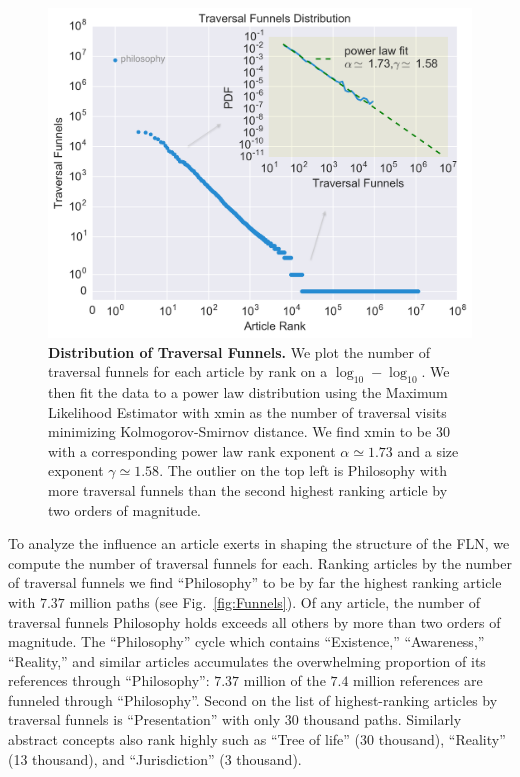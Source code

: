 \documentclass[pre,twocolumn,twoside,superscriptaddress,floatfix]{revtex4-1}
\begin{document}
{\begin{figure}[tp!]
  \includegraphics[width=\columnwidth]{fig012_funnels_distribution.pdf}
  \caption{
    \textbf{Distribution of Traversal Funnels.}
    We plot the number of traversal funnels for each article by rank on a $\log_{10}-\log_{10}$. We then fit the data to a power law 
    distribution using the Maximum Likelihood Estimator with xmin as the number of traversal visits minimizing Kolmogorov-Smirnov distance. We find xmin to be 30 with a corresponding power law rank exponent $\alpha \simeq 1.73$ and a size exponent $\gamma \simeq 1.58$.
    The outlier on the top left is Philosophy with more traversal funnels than the second highest ranking article by two orders of magnitude.
}
  \label{fig:Funnels Distribution}
\end{figure}

To analyze the influence an article exerts in shaping the 
structure of the FLN, we compute the number of traversal funnels for each.
Ranking articles by the number of traversal funnels we find 
``Philosophy'' to be by far the highest ranking article with 
$7.37$ million paths
(see Fig.~\ref{fig:Funnels}).
Of any article, the number of traversal funnels Philosophy holds exceeds 
all others by more than two orders of magnitude.
The ``Philosophy'' cycle which contains ``Existence,'' ``Awareness,'' ``Reality,'' 
and similar articles accumulates the overwhelming proportion of its 
references through ``Philosophy'': $7.37$ million of the $7.4$ million references
are funneled through ``Philosophy''.
Second on the list of highest-ranking articles by traversal funnels is 
``Presentation'' with only $30$ thousand paths. Similarly abstract 
concepts also rank highly such as ``Tree of life'' (30 thousand), 
``Reality'' (13 thousand), and ``Jurisdiction'' (3 thousand).

}
\end{document}
